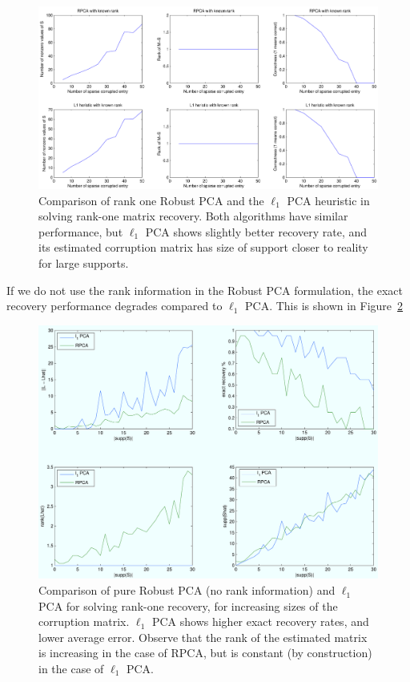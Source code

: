 \begin{figure}[h!]
\centering
\includegraphics[width=\textwidth]{../figures/compare.pdf}
\caption{Comparison of rank one Robust PCA and the $\ell_1$ PCA heuristic in solving rank-one matrix recovery. Both algorithms have similar performance, but $\ell_1$ PCA shows slightly better recovery rate, and its estimated corruption matrix has size of support closer to reality for large supports.}
\label{fig:l1pca_vs_rankone_rpca}
\end{figure}

If we do not use the rank information in the Robust PCA formulation, the exact recovery performance degrades compared to $\ell_1$ PCA. This is shown in Figure~\ref{fig:l1pca_vs_pure_rpca}

\begin{figure}[h!]
\centering
\includegraphics[width=\textwidth]{../figures/l1pca_rk1_rpca_vs_l1pca.pdf}
\caption{Comparison of pure Robust PCA (no rank information) and $\ell_1$ PCA for solving rank-one recovery, for increasing sizes of the corruption matrix. $\ell_1$ PCA shows higher exact recovery rates, and lower average error. Observe that the rank of the estimated matrix is increasing in the case of RPCA, but is constant (by construction) in the case of $\ell_1$ PCA.}
\label{fig:l1pca_vs_pure_rpca}
\end{figure}


